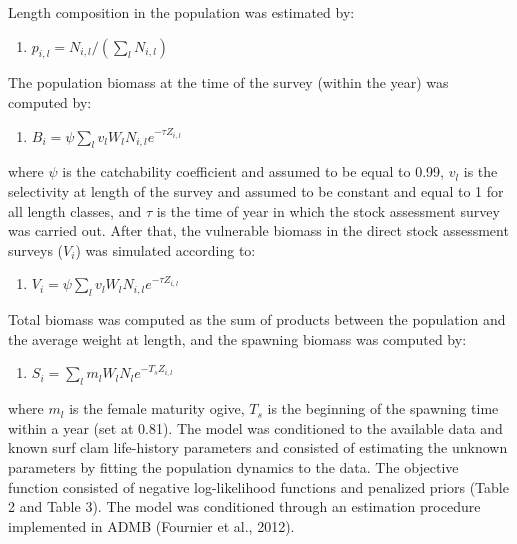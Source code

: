 \documentclass[]{article}
\providecommand{\tightlist}{%
  \setlength{\itemsep}{0pt}\setlength{\parskip}{0pt}}
\begin{document}
Length composition in the population was estimated by:

\begin{enumerate}
\def\labelenumi{\arabic{enumi})}
\setcounter{enumi}{9}
\tightlist
\item
  \(p_{i,l}=N_{i,l}/(\sum_l N_{i,l})\)
\end{enumerate}

The population biomass at the time of the survey (within the year) was
computed by:

\begin{enumerate}
\def\labelenumi{\arabic{enumi})}
\setcounter{enumi}{10}
\tightlist
\item
  \(B_i=\psi \sum_l v_l W_l N_{i,l} e^{-\tau Z_{i,l}}\)
\end{enumerate}

where \(\psi\) is the catchability coefficient and assumed to be equal
to 0.99, \(v_l\) is the selectivity at length of the survey and assumed
to be constant and equal to 1 for all length classes, and \(\tau\) is
the time of year in which the stock assessment survey was carried out.
After that, the vulnerable biomass in the direct stock assessment
surveys (\(V_i\)) was simulated according to:

\begin{enumerate}
\def\labelenumi{\arabic{enumi})}
\setcounter{enumi}{11}
\tightlist
\item
  \(V_i = \psi \sum_l v_l W_l N_{i,l} e^{-\tau Z_{i,l}}\)
\end{enumerate}

Total biomass was computed as the sum of products between the population
and the average weight at length, and the spawning biomass was computed
by:

\begin{enumerate}
\def\labelenumi{\arabic{enumi})}
\setcounter{enumi}{12}
\tightlist
\item
  \(S_i=\sum_l m_l W_l N_l e^{-T_s Z_{i,l}}\)
\end{enumerate}

where \(m_l\) is the female maturity ogive, \(T_s\) is the beginning of
the spawning time within a year (set at 0.81). The model was conditioned
to the available data and known surf clam life-history parameters and
consisted of estimating the unknown parameters by fitting the population
dynamics to the data. The objective function consisted of negative
log-likelihood functions and penalized priors (Table 2 and Table 3). The
model was conditioned through an estimation procedure implemented in
ADMB (Fournier et al., 2012).
\end{document}
